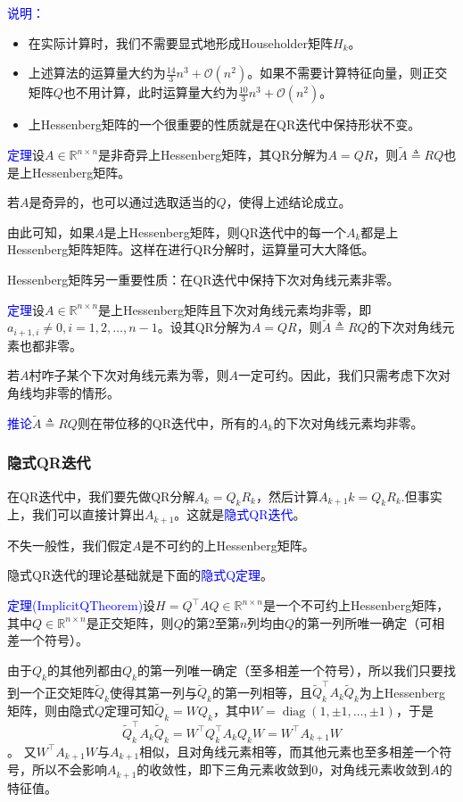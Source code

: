 \documentclass[12pt,a4paper]{article}
\begin{document}
\textcolor{blue}{说明：}
\begin{itemize}
	\item 在实际计算时，我们不需要显式地形成Householder矩阵$H_k$。
	\item 上述算法的运算量大约为$\frac{14}{3} n^{3}+\mathcal{O}\left(n^{2}\right)$。如果不需要计算特征向量，则正交矩阵$Q$也不用计算，此时运算量大约为$\frac{10}{3} n^{3}+\mathcal{O}\left(n^{2}\right)$。
	\item 上Hessenberg矩阵的一个很重要的性质就是在QR迭代中保持形状不变。
\end{itemize}

\textcolor{blue}{定理}\quad 设$A \in \mathbb{R}^{n \times n}$是非奇异上Hessenberg矩阵，其QR分解为$A=QR$，则$\tilde{A} \triangleq R Q$也是上Hessenberg矩阵。

若$A$是奇异的，也可以通过选取适当的$Q$，使得上述结论成立。

由此可知，如果$A$是上Hessenberg矩阵，则QR迭代中的每一个$A_k$都是上Hessenberg矩阵矩阵。这样在进行QR分解时，运算量可大大降低。

Hessenberg矩阵另一重要性质：在QR迭代中保持下次对角线元素非零。

\textcolor{blue}{定理}\quad 设$A \in \mathbb{R}^{n \times n}$是上Hessenberg矩阵且下次对角线元素均非零，即$a_{i+1, i} \neq 0, i=1,2, \ldots, n-1$。设其QR分解为$A=QR$，则$\tilde{A} \triangleq R Q$的下次对角线元素也都非零。

若$A$村咋子某个下次对角线元素为零，则$A$一定可约。因此，我们只需考虑下次对角线均非零的情形。

\textcolor{blue}{推论}\quad $\tilde{A} \triangleq R Q$则在带位移的QR迭代中，所有的$A_k$的下次对角线元素均非零。
\subsubsection{隐式QR迭代}
在QR迭代中，我们要先做QR分解$A_k=Q_kR_k$，然后计算$A_{k+1}k=Q_kR_k$.但事实上，我们可以直接计算出$A_{k+1}$。这就是\textcolor{blue}{隐式QR迭代}。

不失一般性，我们假定$A$是不可约的上Hessenberg矩阵。

隐式QR迭代的理论基础就是下面的\textcolor{blue}{隐式Q定理}。

\textcolor{blue}{定理(ImplicitQTheorem)}\quad 设$H=Q^{\top} A Q \in \mathbb{R}^{n \times n}$是一个不可约上Hessenberg矩阵，其中$Q \in \mathbb{R}^{n \times n}$是正交矩阵，则$Q$的第$2$至第$n$列均由$Q$的第一列所唯一确定（可相差一个符号）。

由于$Q_k$的其他列都由$Q_k$的第一列唯一确定（至多相差一个符号），所以我们只要找到一个正交矩阵$\tilde{Q}_{k}$使得其第一列与$\tilde{Q}_{k}$的第一列相等，且$\tilde{Q}_{k}^{\top} A_{k} \tilde{Q}_{k}$为上Hessenberg矩阵，则由隐式$Q$定理可知$\tilde{Q}_{k}=W Q_{k}$，其中$W=\operatorname{diag}(1, \pm 1, \ldots, \pm 1)$，于是$$
\tilde{Q}_{k}^{\top} A_{k} \tilde{Q}_{k}=W^{\top} Q_{k}^{\top} A_{k} Q_{k} W=W^{\top} A_{k+1} W
$$。
又$W^{\top} A_{k+1} W$与$A_{k+1}$相似，且对角线元素相等，而其他元素也至多相差一个符号，所以不会影响$A_{k+1}$的收敛性，即下三角元素收敛到$0$，对角线元素收敛到$A$的特征值。
\end{document}
